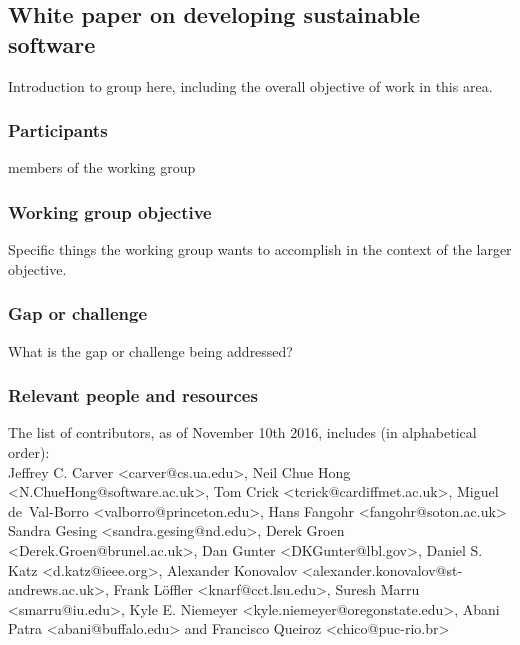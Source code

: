 \subsection{White paper on developing sustainable software}
\label{sec:best-practices-developing}


Introduction to group here, including the overall objective of work in this area.

\subsubsection{Participants}

members of the working group

\subsubsection{Working group objective}

Specific things the working group wants to accomplish in the context of the larger objective.

\subsubsection{Gap or challenge}

What is the gap or challenge being addressed?

\subsubsection{Relevant people and resources}

The list of contributors, as of November 10th 2016, includes (in alphabetical order): \\
Jeffrey C. Carver <carver@cs.ua.edu>, 
Neil Chue Hong <N.ChueHong@software.ac.uk>, 
Tom Crick <tcrick@cardiffmet.ac.uk>, 
Miguel de~Val-Borro <valborro@princeton.edu>, 
Hans Fangohr <fangohr@soton.ac.uk>
Sandra Gesing <sandra.gesing@nd.edu>, 
Derek Groen <Derek.Groen@brunel.ac.uk>, 
Dan Gunter <DKGunter@lbl.gov>,
Daniel S. Katz <d.katz@ieee.org>,
Alexander Konovalov <alexander.konovalov@st-andrews.ac.uk>,
Frank L\"offler <knarf@cct.lsu.edu>,
Suresh Marru <smarru@iu.edu>,
Kyle E. Niemeyer <kyle.niemeyer@oregonstate.edu>,
Abani Patra <abani@buffalo.edu> 
and 
Francisco Queiroz <chico@puc-rio.br>


